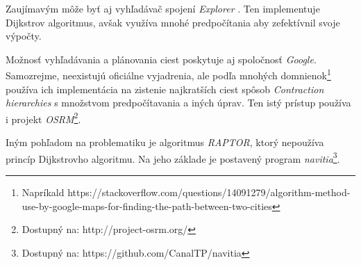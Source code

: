Zaujímavým môže byť aj vyhľadávač spojení \textit{Explorer} \cite{watkins2010explore}. Ten implementuje Dijkstrov algoritmus, avšak využíva mnohé predpočítania aby zefektívnil svoje výpočty.\newline

Možnosť vyhľadávania a plánovania ciest poskytuje aj spoločnosť \textit{Google}. Samozrejme, neexistujú oficiálne vyjadrenia, ale podľa mnohých domnienok\footnote{Napríkald https://stackoverflow.com/questions/14091279/algorithm-method-use-by-google-maps-for-finding-the-path-between-two-cities} používa ich implementácia na zistenie najkratších ciest spôsob \textit{Contraction hierarchies} s množstvom predpočítavania a iných úprav. Ten istý prístup používa i projekt \textit{OSRM}\footnote{Dostupný na: http://project-osrm.org/}.\newline

Iným pohľadom na problematiku je algoritmus \textit{RAPTOR}\cite{delling2014round}, ktorý nepoužíva princíp Dijkstrovho algoritmu. Na jeho základe je postavený program \textit{navitia}\footnote{Dostupný na: https://github.com/CanalTP/navitia}.\newline
